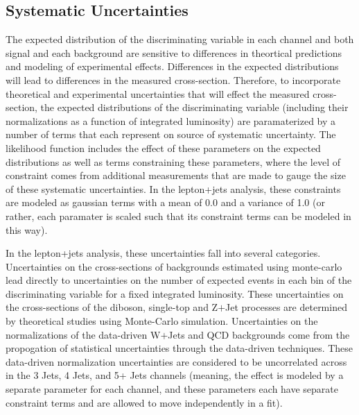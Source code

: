 \subsection{Systematic Uncertainties}

The expected distribution of the discriminating variable in each channel and both signal and each background are sensitive to differences in theortical predictions and modeling of experimental effects.
Differences in the expected distributions will lead to differences in the measured cross-section.
Therefore, to incorporate theoretical and experimental uncertainties that will effect the measured cross-section, the expected distributions of the discriminating variable (including their normalizations as a function of integrated luminosity) are paramaterized by a number of terms that each represent on source of systematic uncertainty.
The likelihood function includes the effect of these parameters on the expected distributions as well as terms constraining these parameters, where the level of constraint comes from additional measurements that are made to gauge the size of these systematic uncertainties.
In the lepton+jets analysis, these constraints are modeled as gaussian terms with a mean of 0.0 and a variance of 1.0 (or rather, each paramater is scaled such that its constraint terms can be modeled in this way).

In the lepton+jets analysis, these uncertainties fall into several categories.  
Uncertainties on the cross-sections of backgrounds estimated using monte-carlo lead directly to uncertainties on the number of expected events in each bin of the discriminating variable for a fixed integrated luminosity.
These uncertainties on the cross-sections of the diboson, single-top and Z$+$Jet processes are determined by theoretical studies using Monte-Carlo simulation.
Uncertainties on the normalizations of the data-driven W$+$Jets and QCD backgrounds come from the propogation of statistical uncertainties through the data-driven techniques.
These data-driven normalization uncertainties are considered to be uncorrelated across in the 3 Jets, 4 Jets, and 5+ Jets channels (meaning, the effect is modeled by a separate parameter for each channel, and these parameters each have separate constraint terms and are allowed to move independently in a fit).

